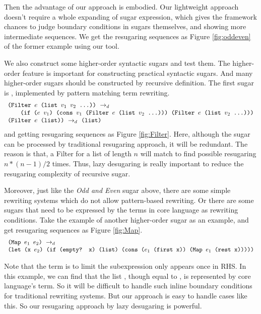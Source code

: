 Then the advantage of our approach is embodied. Our lightweight approach doesn't require a whole expanding of sugar expression, which gives the framework chances to judge boundary conditions in sugars themselves, and showing more intermediate sequences. We get the resugaring sequences as Figure \ref{fig:oddeven} of the former example using our tool.



We also construct some higher-order syntactic sugars and test them. The higher-order feature is important for constructing practical syntactic sugars. And many higher-order sugars should be constructed by recursive definition. The first sugar is , implemented by pattern matching term rewriting.
\[\begin{array}{l}
\drule{\Code{(Filter $e$ (list $v_1$ $v_2$ ...))}}{}\\
\qquad\Code{(if ($e$ $v_1$) (cons $v_1$ (Filter $e$ (list $v_2$ ...)))\ (Filter $e$ (list $v_2$ ...)))}\\
\drule{\Code{(Filter $e$ (list))}}{\Code{(list)}}
\end{array}\]
and getting resugaring sequences as Figure \ref{fig:Filter}.
Here, although the sugar can be processed by traditional resugaring approach, it will be redundant. The reason is that, a Filter for a list of length $n$ will match to find possible resugaring $n*(n-1)/2$ times. Thus, lazy desugaring is really important to reduce the resugaring complexity of recursive sugar.

Moreover, just like the \emph{Odd and Even} sugar above, there are some simple rewriting systems which do not allow pattern-based rewriting. Or there are some sugars that need to be expressed by the terms in core language as rewriting conditions. Take the example of another higher-order sugar  as an example, and get resugaring sequences as Figure \ref{fig:Map}.
\[
\begin{array}{l}
\texttt{(Map $e_1$ $e_2$)} ~\rightarrow_d~\\
\texttt{(let (x $e_2$) (if (empty? x) (list) (cons ($e_1$ (first x)) (Map $e_1$ (rest x)))))}
\end{array}
\]



Note that the  term is to limit the subexpression only appears once in RHS. In this example, we can find that the list , though equal to , is represented by core language's term. So it will be difficult to handle such inline boundary conditions for traditional rewriting systems. But our approach is easy to handle cases like this. So our resugaring approach by lazy desugaring is powerful.
